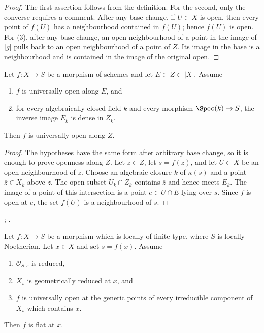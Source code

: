 \begin{proof}
The first assertion follows from the definition. For the second, only the
converse requires a comment. After any base change, if $U \subset X$ is open,
then every point of $f(U)$ has a neighbourhood contained in $f(U)$; hence
$f(U)$ is open. For (3), after any base change, an open neighbourhood of a
point in the image of $|g|$ pulls back to an open neighbourhood of a point of
$Z$. Its image in the base is a neighbourhood and is contained in the image
of the original open.
\end{proof}

\begin{lemma}
\label{lemma-universally-open-along-fibrewise-dense}
Let $f : X \to S$ be a morphism of schemes and let
$E \subset Z \subset |X|$. Assume
\begin{enumerate}
\item $f$ is universally open along $E$, and
\item for every algebraically closed field $k$ and every morphism
$\Spec(k) \to S$, the inverse image $E_k$ is dense in $Z_k$.
\end{enumerate}
Then $f$ is universally open along $Z$.
\end{lemma}

\begin{proof}
The hypotheses have the same form after arbitrary base change, so it is
enough to prove openness along $Z$. Let $z \in Z$, let $s=f(z)$, and let
$U \subset X$ be an open neighbourhood of $z$. Choose an algebraic closure
$k$ of $\kappa(s)$ and a point $\overline{z} \in X_k$ above $z$. The open
subset $U_k \cap Z_k$ contains $\overline{z}$ and hence meets $E_k$. The
image of a point of this intersection is a point $e \in U \cap E$ lying over
$s$. Since $f$ is open at $e$, the set $f(U)$ is a neighbourhood of $s$.
\end{proof}

\begin{lemma}
\label{lemma-universally-open-geometrically-reduced-flat}
\begin{reference}
\cite[IV, Theorem 15.2.2 and Corollary 15.2.3]{EGA};
\cite[Expos\'e 236, Corollary 1.8, p. 229]{FGA}.
\end{reference}
Let $f : X \to S$ be a morphism which is locally of finite type, where $S$
is locally Noetherian. Let $x \in X$ and set $s=f(x)$. Assume
\begin{enumerate}
\item $\mathcal{O}_{S,s}$ is reduced,
\item $X_s$ is geometrically reduced at $x$, and
\item $f$ is universally open at the generic points of every irreducible
component of $X_s$ which contains $x$.
\end{enumerate}
Then $f$ is flat at $x$.
\end{lemma}

